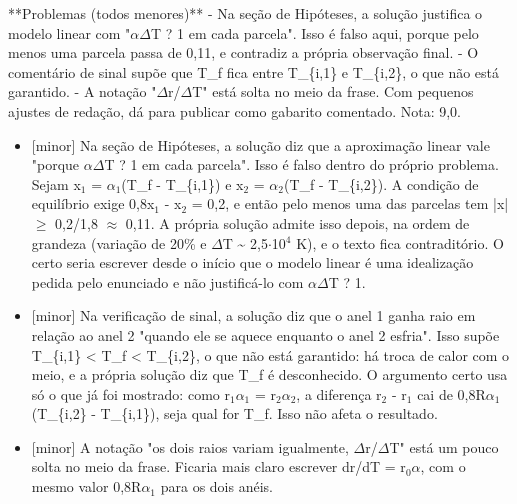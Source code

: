 \documentclass{article}%
\begin{document}
\newline%
**Problemas (todos menores)**\newline%
{-} Na seção de Hipóteses, a solução justifica o modelo linear com "$\alpha$$\Delta$T ? 1 em cada parcela". Isso é falso aqui, porque pelo menos uma parcela passa de 0,11, e contradiz a própria observação final.\newline%
{-} O comentário de sinal supõe que T\_f fica entre T\_\{i,1\} e T\_\{i,2\}, o que não está garantido.\newline%
{-} A notação "$\Delta$r/$\Delta$T" está solta no meio da frase.\newline%
\newline%
Com pequenos ajustes de redação, dá para publicar como gabarito comentado. Nota: 9,0.%
\begin{itemize}%
\item%
{[}minor{]} Na seção de Hipóteses, a solução diz que a aproximação linear vale "porque $\alpha$$\Delta$T ? 1 em cada parcela". Isso é falso dentro do próprio problema. Sejam x$_{1}$ = $\alpha$$_{1}$(T\_f - T\_\{i,1\}) e x$_{2}$ = $\alpha$$_{2}$(T\_f - T\_\{i,2\}). A condição de equilíbrio exige 0,8x$_{1}$ - x$_{2}$ = 0,2, e então pelo menos uma das parcelas tem |x| $\geq$ 0,2/1,8 $\approx$ 0,11. A própria solução admite isso depois, na ordem de grandeza (variação de 20\% e $\Delta$T \textasciitilde{} 2,5$\cdot$10$^{4}$ K), e o texto fica contraditório. O certo seria escrever desde o início que o modelo linear é uma idealização pedida pelo enunciado e não justificá{-}lo com $\alpha$$\Delta$T ? 1.%
\item%
{[}minor{]} Na verificação de sinal, a solução diz que o anel 1 ganha raio em relação ao anel 2 "quando ele se aquece enquanto o anel 2 esfria". Isso supõe T\_\{i,1\} < T\_f < T\_\{i,2\}, o que não está garantido: há troca de calor com o meio, e a própria solução diz que T\_f é desconhecido. O argumento certo usa só o que já foi mostrado: como r$_{1}$$\alpha$$_{1}$ = r$_{2}$$\alpha$$_{2}$, a diferença r$_{2}$ - r$_{1}$ cai de 0,8R$\alpha$$_{1}$(T\_\{i,2\} - T\_\{i,1\}), seja qual for T\_f. Isso não afeta o resultado.%
\item%
{[}minor{]} A notação "os dois raios variam igualmente, $\Delta$r/$\Delta$T" está um pouco solta no meio da frase. Ficaria mais claro escrever dr/dT = r$_{0}$$\alpha$, com o mesmo valor 0,8R$\alpha$$_{1}$ para os dois anéis.%
\end{itemize}%
\end{document}
